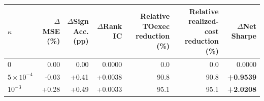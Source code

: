 \begin{tabular}{lrrrrrr}
\hline
$\kappa$ & $\Delta$MSE (\%) & $\Delta$Sign Acc. (pp) & $\Delta$Rank IC & Relative TOexec reduction (\%) & Relative realized-cost reduction (\%) & $\Delta$Net Sharpe \\
\hline
$0$ & 0.00 & 0.00 & 0.0000 & 0.0 & 0.0 & 0.0000 \\
$5\times10^{-4}$ & -0.03 & +0.41 & +0.0038 & 90.8 & 90.8 & \textbf{+0.9539} \\
$10^{-3}$ & +0.28 & +0.49 & +0.0033 & 95.1 & 95.1 & \textbf{+2.0208} \\
\hline
\end{tabular}
